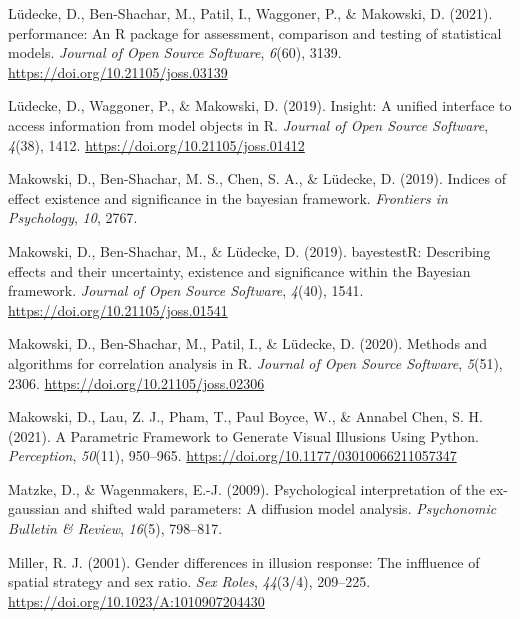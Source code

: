 \documentclass[
  man,floatsintext]{apa6}
\newlength{\cslhangindent}
\newlength{\cslentryspacingunit} %
\newenvironment{CSLReferences}[2] %
 {%
  \setlength{\parindent}{0pt}
  \ifodd #1
  \let\oldpar\par
  \def\par{\hangindent=\cslhangindent\oldpar}
  \fi
  \setlength{\parskip}{#2\cslentryspacingunit}
 }%
 {}
\begin{document}
\begin{CSLReferences}{1}{0}
\leavevmode{}%
Lüdecke, D., Ben-Shachar, M., Patil, I., Waggoner, P., \& Makowski, D. (2021). {performance}: An {R} package for assessment, comparison and testing of statistical models. \emph{Journal of Open Source Software}, \emph{6}(60), 3139. \url{https://doi.org/10.21105/joss.03139}

\leavevmode{}%
Lüdecke, D., Waggoner, P., \& Makowski, D. (2019). Insight: A unified interface to access information from model objects in {R}. \emph{Journal of Open Source Software}, \emph{4}(38), 1412. \url{https://doi.org/10.21105/joss.01412}

\leavevmode{}%
Makowski, D., Ben-Shachar, M. S., Chen, S. A., \& Lüdecke, D. (2019). Indices of effect existence and significance in the bayesian framework. \emph{Frontiers in Psychology}, \emph{10}, 2767.

\leavevmode{}%
Makowski, D., Ben-Shachar, M., \& Lüdecke, D. (2019). {bayestestR}: Describing effects and their uncertainty, existence and significance within the {Bayesian} framework. \emph{Journal of Open Source Software}, \emph{4}(40), 1541. \url{https://doi.org/10.21105/joss.01541}

\leavevmode{}%
Makowski, D., Ben-Shachar, M., Patil, I., \& Lüdecke, D. (2020). Methods and algorithms for correlation analysis in {R}. \emph{Journal of Open Source Software}, \emph{5}(51), 2306. \url{https://doi.org/10.21105/joss.02306}

\leavevmode{}%
Makowski, D., Lau, Z. J., Pham, T., Paul Boyce, W., \& Annabel Chen, S. H. (2021). A Parametric Framework to Generate Visual Illusions Using Python. \emph{Perception}, \emph{50}(11), 950--965. \url{https://doi.org/10.1177/03010066211057347}

\leavevmode{}%
Matzke, D., \& Wagenmakers, E.-J. (2009). Psychological interpretation of the ex-gaussian and shifted wald parameters: A diffusion model analysis. \emph{Psychonomic Bulletin \& Review}, \emph{16}(5), 798--817.

\leavevmode{}%
Miller, R. J. (2001). Gender differences in illusion response: The inffluence of spatial strategy and sex ratio. \emph{Sex Roles}, \emph{44}(3/4), 209--225. \url{https://doi.org/10.1023/A:1010907204430}


\end{CSLReferences}
\end{document}
